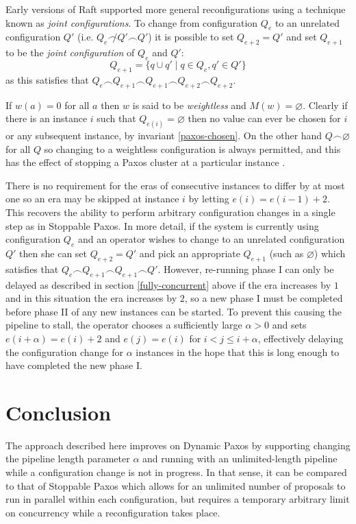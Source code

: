 \documentclass[journal]{IEEEtran}
\begin{document}
Early versions of Raft supported more general reconfigurations using a
technique known as \textit{joint configurations}. To change from configuration
$Q_{e}$ to an unrelated configuration $Q'$ (i.e.  $Q_{e} \not\frown Q' \frown
Q'$) it is possible to set $Q_{e+2} = Q'$ and set $Q_{e+1}$ to be the
\textit{joint configuration} of $Q_{e}$ and $Q'$: \[Q_{e+1} = \{ q \cup q' \mid
q \in Q_{e}, q' \in Q' \}\] as this satisfies that $Q_{e} \frown Q_{e + 1}
\frown Q_{e+1} \frown Q_{e + 2} \frown Q_{e + 2}$.

If $w(a) = 0$ for all $a$ then $w$ is said to be \textit{weightless} and $M(w)
= \varnothing$. Clearly if there is an instance $i$ such that $Q_{e(i)} =
\varnothing$ then no value can ever be chosen for $i$ or any subsequent
instance, by invariant \ref{paxos-chosen}. On the other hand $Q \frown
\varnothing$ for all $Q$ so changing to a weightless configuration is always
permitted, and this has the effect of stopping a Paxos cluster at a particular
instance \cite{reconfiguring-a-state-machine,stoppable-paxos}.

There is no requirement for the eras of consecutive instances to differ by at
most one so an era may be skipped at instance $i$ by letting $e(i) = e(i-1) +
2$.  This recovers the ability to perform arbitrary configuration changes in a
single step as in Stoppable Paxos. In more detail, if the system is currently
using configuration $Q_{e}$ and an operator wishes to change to an unrelated
configuration $Q'$ then she can set $Q_{e+2} = Q'$ and pick an appropriate
$Q_{e+1}$ (such as $\varnothing$) which satisfies that $Q_{e} \frown Q_{e + 1}
\frown Q_{e+1} \frown Q'$.  However, re-running phase I can only be delayed as
described in section \ref{fully-concurrent} above if the era increases by $1$
and in this situation the era increases by $2$, so a new phase I must be
completed before phase II of any new instances can be started.  To prevent this
causing the pipeline to stall, the operator chooses a sufficiently large
$\alpha > 0$ and sets $e(i+\alpha) = e(i)+2$ and $e(j) = e(i)$ for $i < j \le i
+ \alpha$, effectively delaying the configuration change for $\alpha$ instances
in the hope that this is long enough to have completed the new phase I.

\section{Conclusion}

The approach described here improves on Dynamic Paxos\cite{cheap-paxos} by
supporting changing the pipeline length parameter $\alpha$ and running with an
unlimited-length pipeline while a configuration change is not in progress.  In
that sense, it can be compared to that of Stoppable Paxos\cite{stoppable-paxos}
which allows for an unlimited number of proposals to run in parallel within
each configuration, but requires a temporary arbitrary limit on concurrency
while a reconfiguration takes place.
\end{document}
